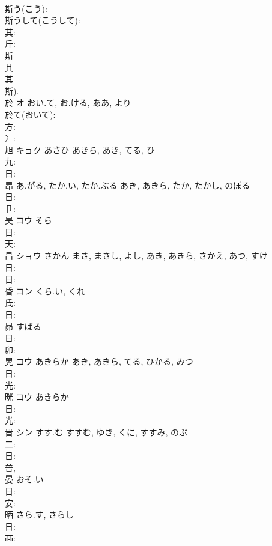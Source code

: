 \documentclass[8pt]{extreport}
\begin{document}
\begin{CJK}{UTF8}{min}
\\	斯う(こう): 
\\	斯うして(こうして): 
\\	其: 
\\	斤: 
\\	斯 
\\	其 
\\	其 
\\	斯). 
\\	於	オ	おい.て, お.ける, ああ, より		
\\	於て(おいて): 
\\	方: 
\\	冫: 
\\	旭	キョク	あさひ	あきら, あき, てる, ひ	
\\	九: 
\\	日: 
\\	昂		あ.がる, たか.い, たか.ぶる	あき, あきら, たか, たかし, のぼる			
\\	日: 
\\	卩: 
\\	昊	コウ	そら		
\\	日: 
\\	天: 
\\	昌	ショウ	さかん	まさ, まさし, よし, あき, あきら, さかえ, あつ, すけ	
\\	日: 
\\	日: 
\\	昏	コン	くら.い, くれ		
\\	氏: 
\\	日: 
\\	昴		すばる				
\\	日: 
\\	卯: 
\\	晃	コウ	あきらか	あき, あきら, てる, ひかる, みつ	
\\	日: 
\\	光: 
\\	晄	コウ	あきらか		
\\	日: 
\\	光: 
\\	晋	シン	すす.む	すすむ, ゆき, くに, すすみ, のぶ	
\\	二: 
\\	日: 
\\	普, 
\\	晏		おそ.い				
\\	日: 
\\	安: 
\\	晒		さら.す, さらし				
\\	日: 
\\	襾: 

\end{CJK}
\end{document}
